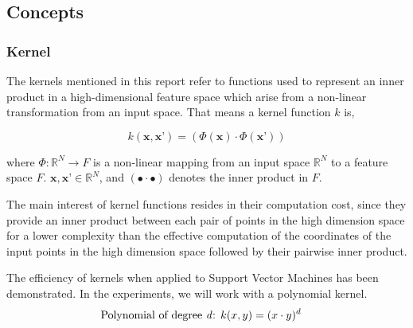\subsection{Concepts}
\subsubsection{Kernel} \label{sec:kernel}
The kernels mentioned in this report refer to functions used to represent an inner product in a high-dimensional feature space which arise from a non-linear transformation from an input space. That means a kernel function $k$ is,

\begin{equation}
k(\textbf{x},\textbf{x'}) = (\Phi(\textbf{x})\cdot\Phi(\textbf{x'}))
\end{equation}

where $\Phi: \mathbb{R}^N\rightarrow F$ is a non-linear mapping from an input space $\mathbb{R}^N$ to a feature space $F$. $\textbf{x},\textbf{x'}\in \mathbb{R}^N$, and $(\bullet\cdot\bullet)$ denotes the inner product in $F$. 

The main interest of kernel functions resides in their computation cost, since they provide an inner product between each pair of points in the high dimension space for a lower complexity than the effective computation of the coordinates of the input points in the high dimension space followed by their pairwise inner product\cite{boser1992training}.

The efficiency of kernels when applied to Support Vector Machines has been demonstrated\cite{scholkopf1996incorporating}. In the experiments, we will work with a polynomial kernel.
\begin{align}
\text{Polynomial of degree \textit{d}: }& k(x,y) = (x \cdot y)^d
\end{align}





